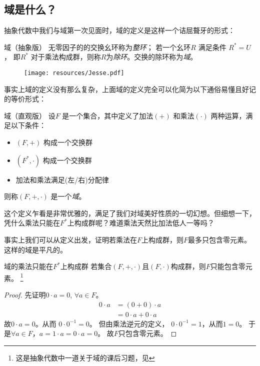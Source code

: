 \subsection{域是什么？}

抽象代数中我们与域第一次见面时，域的定义是这样一个诘屈聱牙的形式：
\begin{definition}{域（抽象版）}
    无零因子的的交换幺环称为\emph{整环}； 若一个幺环\(R\) 满足条件 \(R^{*}=U\)，
    即\(R^{*}\) 对于乘法构成群，则称\(R\)为\emph{除环}。交换的除环称为\emph{域}。
\end{definition}

\begin{figure}[H]
    \centering
    \texttt{[image: resources/Jesse.pdf]}
\end{figure}
事实上域的定义没有那么复杂，上面域的定义完全可以化简为以下通俗易懂且好记的等价形式：
\begin{definition}{域（直观版）}
    设\(F\) 是一个集合，其中定义了加法\((+)\) 和乘法\((\cdot)\) 两种运算，满足以下条件：
    \begin{itemize}
        \item \((F, +)\) 构成一个交换群
        \item \((F^{*}, \cdot)\) 构成一个交换群
        \item 加法和乘法满足(左/右)分配律
    \end{itemize}
    则称\((F, +, \cdot)\) 是一个\emph{域}。
\end{definition}

这个定义乍看是非常优雅的，满足了我们对域美好性质的一切幻想。但细想一下，
凭什么乘法只能在\(F^{*}\)上构成群呢？难道乘法天然比加法低人一等吗？

事实上我们可以从定义出发，证明若乘法在\(F\)上构成群，则\(F\)最多只包含零元素。这样的域是平凡的。

\begin{theorem}{域的乘法只能在\(F^{*}\)上构成群}
    若集合\((F, + ,\cdot)\)且\((F,\cdot)\)构成群，则\(F\)只能包含零元素。
    \footnote{这是抽象代数中一道关于域的课后习题，见}
\end{theorem}


\begin{proof}
    先证明\(0 \cdot a=0\), \(\forall a \in F\)。
    \begin{align*}
        0 \cdot a &= (0+0) \cdot a\\
        &= 0 \cdot a + 0 \cdot a
    \end{align*}
    故\(0 \cdot a=0\)。从而 \(0\cdot 0^{-1}=0\)。
    但由乘法逆元的定义， \(0 \cdot 0^{-1}=1\)，从而\(1=0\)。
    于是\(\forall a \in F\)，\(a=1 \cdot a=0 \cdot a=0\)。
    故\(F\)只包含零元素。
\end{proof}

